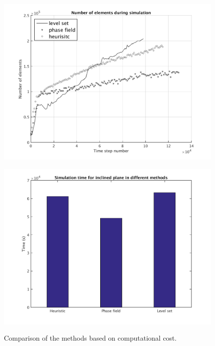 \documentclass[letterpaper,10pt]{article}
\begin{document}
\begin{figure}[H]
        \begin{minipage}[b]{.5\linewidth}
                \centering
                \includegraphics[scale=0.45]{IMAGES/colima_num_elem.png}
                \label{col_amr}
                
        \end{minipage}
        \begin{minipage}[b]{.5 \linewidth}
                \centering
                \includegraphics[scale=0.45]{IMAGES/colima_timing1.png}
                \label{comp_col}
        \end{minipage}
        \caption{Comparison of the methods based on computational cost.}
        \label{compinc}
\end{figure}
\end{document}
